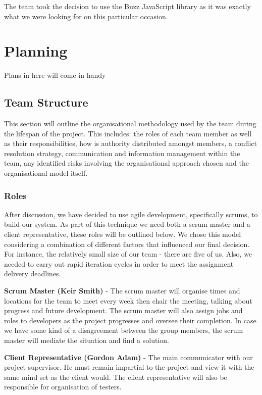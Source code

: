 \documentclass{l3proj}
\begin{document}
The team took the decision to use the Buzz JavaScript library as it was exactly what we were looking for on this particular occasion.

\chapter{Planning}
\label{Planning}

Plans in here will come in handy

\section{Team Structure}This section will outline the organisational methodology used by the team during the lifespan of the project. This includes: the roles of each team member as well as their responsibilities, how is authority distributed amongst members, a conflict resolution strategy, communication and information management within the team, any identified risks involving the organisational approach chosen and the organisational model itself.

\subsection{Roles}After discussion, we have decided to use agile development, specifically scrums, to build our system. As part of this technique we need both a scrum master and a client representative, these roles will be outlined below. We chose this model considering a combination of different factors that influenced our final decision. For instance, the relatively small size of our team - there are five of us. Also, we needed to carry out rapid iteration cycles in order to meet the assignment delivery deadlines.

{\bf Scrum Master (Keir Smith)} - The scrum master will organise times and locations for the team to meet every week then chair the meeting, talking about progress and future development. The scrum master will also assign jobs and roles to developers as the project progresses and oversee their completion. In case we have some kind of a disagreement between the group members, the scrum master will mediate the situation and find a solution.

{\bf Client Representative (Gordon Adam)} - The main communicator with our project supervisor. He must remain impartial to the project and view it with the same mind set as the client would. The client representative will also be responsible for organisation of testers.
\end{document}
